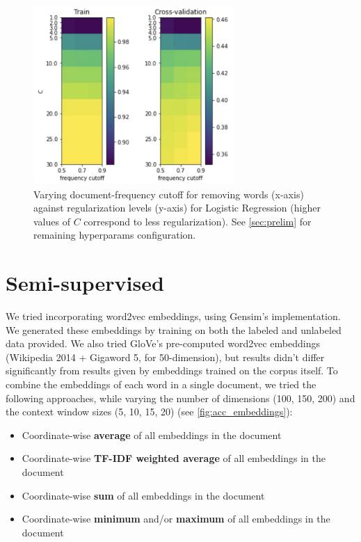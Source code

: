 \documentclass[11pt]{article}
\begin{document}
\begin{figure}
\centering
  \includegraphics[width=3in]{figures/supervised.png}
  \caption{Varying document-frequency cutoff for removing words (x-axis) against regularization levels (y-axis) for Logistic Regression (higher values of $C$ correspond to less regularization). See \cref{sec:prelim} for remaining hyperparams configuration.}
  \label{fig:supervised}
\end{figure}

\section{Semi-supervised}\label{sec:semi}

We tried incorporating word2vec embeddings, using Gensim's implementation. We generated these embeddings by training on both the labeled and unlabeled data provided. We also tried GloVe's pre-computed word2vec embeddings (Wikipedia 2014 + Gigaword 5, for 50-dimension), but results didn't differ significantly from results given by embeddings trained on the corpus itself. To combine the embeddings of each word in a single document, we tried the following approaches, while varying the number of dimensions (100, 150, 200) and the context window sizes (5, 10, 15, 20) (see \cref{fig:acc_embeddings}):

\begin{itemize}
  \item Coordinate-wise \textbf{average} of all embeddings in the document
  \item Coordinate-wise \textbf{TF-IDF weighted average} of all embeddings in the document
  \item Coordinate-wise \textbf{sum} of all embeddings in the document
  \item Coordinate-wise \textbf{minimum} and/or \textbf{maximum} of all embeddings in the document
\end{itemize}
\end{document}
